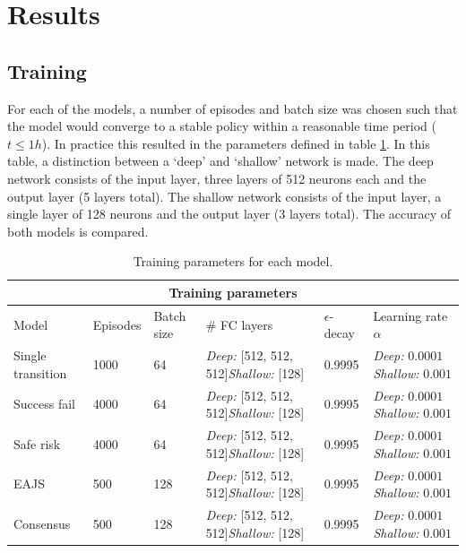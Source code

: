 \newpage
\section{Results}

\subsection{Training}

For each of the models, a number of episodes and batch size was chosen such that the model would converge to a stable policy within a reasonable time period ($t \leq 1h$). In practice this resulted in the parameters defined in table \ref{tab:training-parameters}. In this table, a distinction between a `deep' and `shallow' network is made. The deep network consists of the input layer, three layers of 512 neurons each and the output layer (5 layers total). The shallow network consists of the input layer, a single layer of 128 neurons and the output layer (3 layers total). The accuracy of both models is compared.

\begin{table}[H]
    \begin{tabular}{|l|l|l|p{3cm}|l|p{2.2cm}|}
        \hline
        \multicolumn{6}{|c|}{Training parameters} \\
        \hline
        Model & Episodes & Batch size & \# FC layers & $\epsilon$-decay & Learning rate $\alpha$\\
        \hline
        Single transition & 1000 & 64 & \emph{Deep:} [512, 512, 512]\linebreak\emph{Shallow:} [128] & 0.9995 & \emph{Deep:} $0.0001$\linebreak\emph{Shallow:} $0.001$\\
        \hline
        Success fail & 4000 & 64 & \emph{Deep:} [512, 512, 512]\linebreak\emph{Shallow:} [128] & 0.9995 & \emph{Deep:} $0.0001$\linebreak\emph{Shallow:} $0.001$\\
        \hline
        Safe risk & 4000 & 64 & \emph{Deep:} [512, 512, 512]\linebreak\emph{Shallow:} [128] & 0.9995 & \emph{Deep:} $0.0001$\linebreak\emph{Shallow:} $0.001$\\
        \hline
        EAJS & 500 & 128 & \emph{Deep:} [512, 512, 512]\linebreak\emph{Shallow:} [128] & 0.9995 & \emph{Deep:} $0.0001$\linebreak\emph{Shallow:} $0.001$\\
        \hline
        Consensus & 500 & 128 & \emph{Deep:} [512, 512, 512]\linebreak\emph{Shallow:} [128] & 0.9995 & \emph{Deep:} $0.0001$\linebreak\emph{Shallow:} $0.001$\\
        \hline
    \end{tabular}
    \caption{Training parameters for each model.}
    \label{tab:training-parameters}
\end{table}

